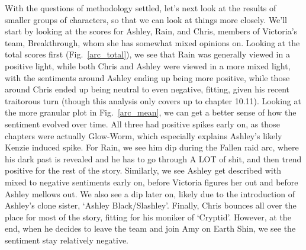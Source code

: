 \documentclass[11pt]{article}
\begin{document}
\noindent
With the questions of methodology settled, let's next look at the results of smaller groups of characters, so that we can look at things more closely. We'll start by looking at the scores for Ashley, Rain, and Chris, members of Victoria's team, Breakthrough, whom she has somewhat mixed opinions on. Looking at the total scores first (Fig.~\ref{arc_total}), we see that Rain was generally viewed in a positive light, while both Chris and Ashley were viewed in a more mixed light, with the sentiments around Ashley ending up being more positive, while those around Chris ended up being neutral to even negative, fitting, given his recent traitorous turn (though this analysis only covers up to chapter 10.11). Looking at the more granular plot in Fig.~\ref{arc_mean}, we can get a better sense of how the sentiment evolved over time. All three had positive spikes early on, as those chapters were actually Glow-Worm, which especially explains Ashley's likely Kenzie induced spike. For Rain, we see him dip during the Fallen raid arc, where his dark past is revealed and he has to go through A LOT of shit, and then trend positive for the rest of the story. Similarly, we see Ashley get described with mixed to negative sentiments early on, before Victoria figures her out and before Ashley mellows out. We also see a dip later on, likely due to the introduction of Ashley's clone sister, `Ashley Black/Slashley'. Finally, Chris bounces all over the place for most of the story, fitting for his moniker of `Cryptid'. However, at the end, when he decides to leave the team and join Amy on Earth Shin, we see the sentiment stay relatively negative. 
\end{document}
